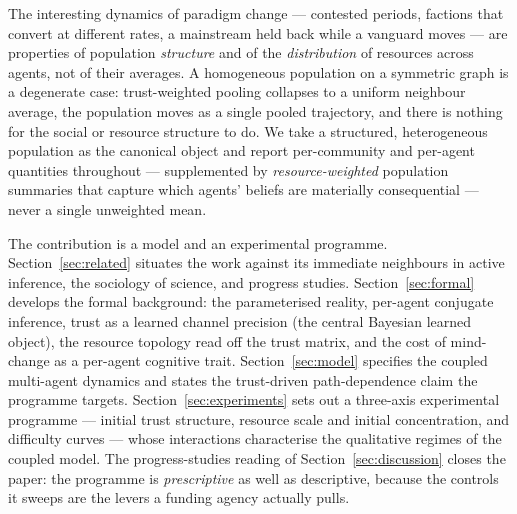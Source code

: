The interesting dynamics of paradigm change --- contested periods,
factions that convert at different rates, a mainstream held back
while a vanguard moves --- are properties of population
\emph{structure} and of the \emph{distribution} of resources across
agents, not of their averages. A homogeneous population on a symmetric
graph is a degenerate case: trust-weighted pooling collapses to a
uniform neighbour average, the population moves as a single pooled
trajectory, and there is nothing for the social or resource structure
to do. We take a structured, heterogeneous population as the canonical
object and report per-community and per-agent quantities throughout
--- supplemented by \emph{resource-weighted} population summaries that
capture which agents' beliefs are materially consequential --- never a
single unweighted mean.

The contribution is a model and an experimental programme.
Section~\ref{sec:related} situates the work against its immediate
neighbours in active inference, the sociology of science, and progress
studies. Section~\ref{sec:formal} develops the formal background: the
parameterised reality, per-agent conjugate inference, trust as a
learned channel precision (the central Bayesian learned object), the
resource topology read off the trust matrix, and the cost of
mind-change as a per-agent cognitive trait.
Section~\ref{sec:model} specifies the coupled multi-agent dynamics and
states the trust-driven path-dependence claim the programme targets.
Section~\ref{sec:experiments} sets out a three-axis experimental
programme --- initial trust structure, resource scale and initial
concentration, and difficulty curves --- whose interactions
characterise the qualitative regimes of the coupled model. The progress-studies reading of
Section~\ref{sec:discussion} closes the paper: the programme is
\emph{prescriptive} as well as descriptive, because the controls it
sweeps are the levers a funding agency actually pulls.
